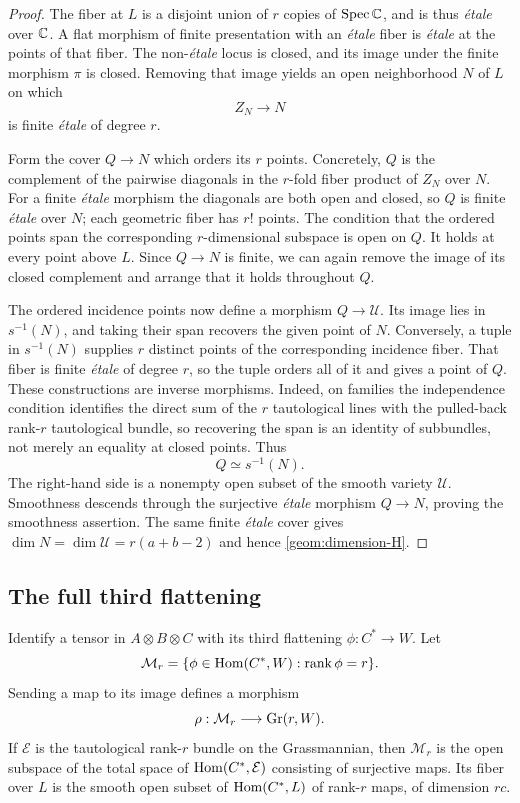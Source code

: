 \begin{proof}
The fiber at $L$ is a disjoint union of $r$ copies of
$\operatorname{Spec}\mathbb C$, and is thus \emph{\'etale} over $\mathbb C$. A flat morphism
of finite presentation with an \emph{\'etale} fiber is
\emph{\'etale} at the points of that fiber. The non-\emph{\'etale}
locus is closed, and its image under the finite morphism $\pi$ is
closed. Removing that image yields an open neighborhood $N$ of $L$
on which
\[
 Z_N\longrightarrow N
\]
is finite \emph{\'etale} of degree $r$.

Form the cover $Q\to N$ which orders its $r$ points. Concretely,
$Q$ is the complement of the pairwise diagonals in the $r$-fold
fiber product of $Z_N$ over $N$. For a finite \emph{\'etale}
morphism the diagonals are both open and closed, so $Q$ is finite
\emph{\'etale} over $N$; each geometric fiber has $r!$ points.
The condition that the ordered points span the corresponding
$r$-dimensional subspace is open on $Q$. It holds at every point
above $L$. Since $Q\to N$ is finite, we can again remove the image
of its closed complement and arrange that it holds throughout $Q$.

The ordered incidence points now define a morphism
$Q\to\mathcal U$. Its image lies in $s^{-1}(N)$, and taking
their span recovers the given point of $N$. Conversely, a tuple
in $s^{-1}(N)$ supplies $r$ distinct points of the corresponding
incidence fiber. That fiber is finite \emph{\'etale} of degree
$r$, so the tuple orders all of it and gives a point of $Q$.
These constructions are inverse morphisms. Indeed, on families
the independence condition identifies the direct sum of the $r$
tautological lines with the pulled-back rank-$r$ tautological bundle,
so recovering the span is an identity of subbundles, not merely
an equality at closed points. Thus
\begin{equation}\label{geom:ordered-span-chart}
 Q\simeq s^{-1}(N).
\end{equation}
The right-hand side is a nonempty open subset of the smooth variety
$\mathcal U$. Smoothness descends through the surjective
\emph{\'etale} morphism $Q\to N$, proving the smoothness assertion.
The same finite \emph{\'etale} cover gives
$\dim N=\dim\mathcal U=r(a+b-2)$ and hence
\eqref{geom:dimension-H}.
\end{proof}

\subsection{The full third flattening}
\label{geom:flattening}

Identify a tensor in $A\otimes B\otimes C$ with its third
flattening $\phi:C^*\to W$. Let
\[
 \mathcal M_r=\{\phi\in\operatorname{Hom}(C^*,W):\operatorname{rank}\phi=r\}.
\]
Sending a map to its image defines a morphism
\[
 \rho:\mathcal M_r\longrightarrow\operatorname{Gr}(r,W).
\]
If $\mathcal E$ is the tautological rank-$r$ bundle on the
Grassmannian, then $\mathcal M_r$ is the open subspace of the
total space of $\operatorname{Hom}(C^*,\mathcal E)$ consisting of surjective
maps. Its fiber over $L$ is the smooth open subset of
$\operatorname{Hom}(C^*,L)$ of rank-$r$ maps, of dimension $rc$.

